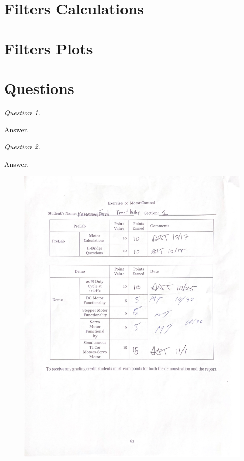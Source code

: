 \documentclass[CMPE]{KGCOEReport}
\begin{document}
\section*{Filters Calculations}

\section*{Filters Plots} %

\section*{Questions}

\emph{Question 1.}

Answer.

\bigskip

\emph{Question 2.}

Answer.

\newpage
\begin{figure}[H]
    \centering
    \begin{adjustbox}{center}
        \includegraphics[width=1.26\textwidth]{signoff.pdf}
    \end{adjustbox}
\end{figure}
\end{document}
